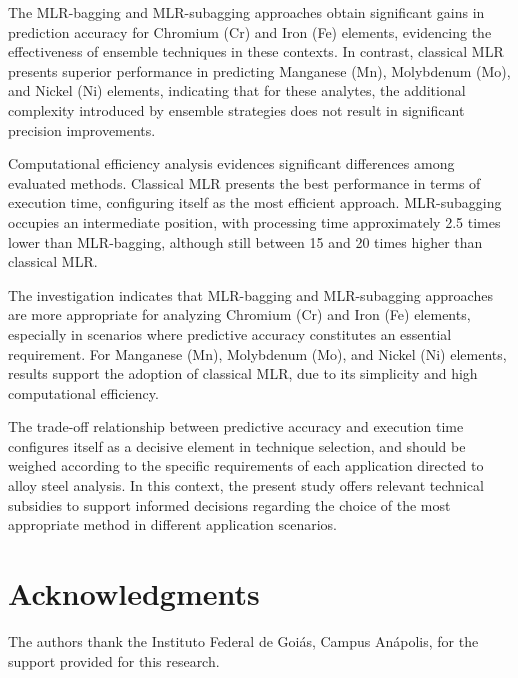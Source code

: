 \documentclass[12pt]{article}
\begin{document}
The MLR-bagging and MLR-subagging approaches obtain significant gains in prediction accuracy for Chromium (Cr) and Iron (Fe) elements, evidencing the effectiveness of ensemble techniques in these contexts. In contrast, classical MLR presents superior performance in predicting Manganese (Mn), Molybdenum (Mo), and Nickel (Ni) elements, indicating that for these analytes, the additional complexity introduced by ensemble strategies does not result in significant precision improvements.

Computational efficiency analysis evidences significant differences among evaluated methods. Classical MLR presents the best performance in terms of execution time, configuring itself as the most efficient approach. MLR-subagging occupies an intermediate position, with processing time approximately 2.5 times lower than MLR-bagging, although still between 15 and 20 times higher than classical MLR.

The investigation indicates that MLR-bagging and MLR-subagging approaches are more appropriate for analyzing Chromium (Cr) and Iron (Fe) elements, especially in scenarios where predictive accuracy constitutes an essential requirement. For Manganese (Mn), Molybdenum (Mo), and Nickel (Ni) elements, results support the adoption of classical MLR, due to its simplicity and high computational efficiency.

The trade-off relationship between predictive accuracy and execution time configures itself as a decisive element in technique selection, and should be weighed according to the specific requirements of each application directed to alloy steel analysis. In this context, the present study offers relevant technical subsidies to support informed decisions regarding the choice of the most appropriate method in different application scenarios.

\section*{Acknowledgments}

The authors thank the Instituto Federal de Goiás, Campus Anápolis, for the support provided for this research.
\end{document}
